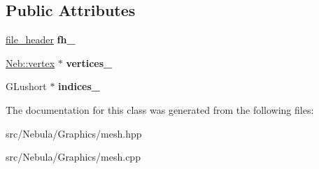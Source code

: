 \subsection*{\-Public \-Attributes}
\begin{DoxyCompactItemize}
\item 
\hypertarget{classNeb_1_1mesh_ac14d8e128fa08a0af6ee94ac8ead51fe}{\hyperlink{structNeb_1_1file__header}{file\-\_\-header} {\bfseries fh\-\_\-}}\label{classNeb_1_1mesh_ac14d8e128fa08a0af6ee94ac8ead51fe}

\item 
\hypertarget{classNeb_1_1mesh_aefde5a8aa00acae79b9200a6586b5516}{\hyperlink{structNeb_1_1vertex}{\-Neb\-::vertex} $\ast$ {\bfseries vertices\-\_\-}}\label{classNeb_1_1mesh_aefde5a8aa00acae79b9200a6586b5516}

\item 
\hypertarget{classNeb_1_1mesh_a797d7464a3d8c5735ed41e244e1de533}{\-G\-Lushort $\ast$ {\bfseries indices\-\_\-}}\label{classNeb_1_1mesh_a797d7464a3d8c5735ed41e244e1de533}

\end{DoxyCompactItemize}


\-The documentation for this class was generated from the following files\-:\begin{DoxyCompactItemize}
\item 
src/\-Nebula/\-Graphics/mesh.\-hpp\item 
src/\-Nebula/\-Graphics/mesh.\-cpp\end{DoxyCompactItemize}
